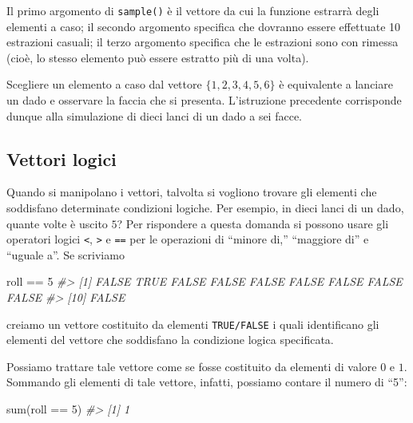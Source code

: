 \documentclass[
]{memoir}
\newenvironment{Shaded}{\begin{snugshade}}{\end{snugshade}}
\newcommand{\CommentTok}[1]{\textcolor[rgb]{0.56,0.35,0.01}{\textit{#1}}}
\newcommand{\DecValTok}[1]{\textcolor[rgb]{0.00,0.00,0.81}{#1}}
\newcommand{\FunctionTok}[1]{\textcolor[rgb]{0.00,0.00,0.00}{#1}}
\newcommand{\NormalTok}[1]{#1}
\newcommand{\SpecialCharTok}[1]{\textcolor[rgb]{0.00,0.00,0.00}{#1}}
\theoremstyle{definition}
\theoremstyle{definition}
\theoremstyle{definition}
\theoremstyle{definition}
\theoremstyle{remark}
\begin{document}
Il primo argomento di \texttt{sample()} è il vettore da cui la funzione
estrarrà degli elementi a caso; il secondo argomento specifica che
dovranno essere effettuate 10 estrazioni casuali; il terzo argomento
specifica che le estrazioni sono con rimessa (cioè, lo stesso elemento
può essere estratto più di una volta).

Scegliere un elemento a caso dal vettore \(\{1, 2, 3, 4, 5, 6\}\) è
equivalente a lanciare un dado e osservare la faccia che si presenta.
L'istruzione precedente corrisponde dunque alla simulazione di dieci
lanci di un dado a sei facce.

\hypertarget{vettori-logici}{%
\subsection{Vettori logici}\label{vettori-logici}}

Quando si manipolano i vettori, talvolta si vogliono trovare gli
elementi che soddisfano determinate condizioni logiche. Per esempio, in
dieci lanci di un dado, quante volte è uscito \(5\)? Per rispondere a
questa domanda si possono usare gli operatori logici \texttt{\textless{}}, \texttt{\textgreater{}} e \texttt{==} per
le operazioni di ``minore di,'' ``maggiore di'' e ``uguale a''. Se scriviamo

\begin{Shaded}
\begin{Highlighting}[]
\NormalTok{roll }\SpecialCharTok{==} \DecValTok{5}
\CommentTok{\#\textgreater{}  [1] FALSE  TRUE FALSE FALSE FALSE FALSE FALSE FALSE FALSE}
\CommentTok{\#\textgreater{} [10] FALSE}
\end{Highlighting}
\end{Shaded}

creiamo un vettore costituito da elementi \texttt{TRUE/FALSE} i quali
identificano gli elementi del vettore che soddisfano la condizione
logica specificata.

Possiamo trattare tale vettore come se fosse costituito da elementi di
valore \(0\) e \(1\). Sommando gli elementi di tale vettore, infatti,
possiamo contare il numero di ``5'':

\begin{Shaded}
\begin{Highlighting}[]
\FunctionTok{sum}\NormalTok{(roll }\SpecialCharTok{==} \DecValTok{5}\NormalTok{)}
\CommentTok{\#\textgreater{} [1] 1}
\end{Highlighting}
\end{Shaded}
\end{document}
